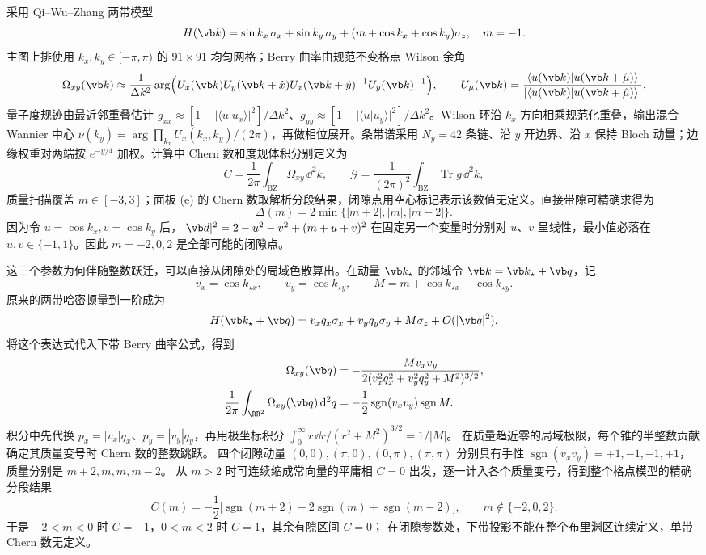 采用 Qi--Wu--Zhang 两带模型
\[H(\vb k)=\sin k_x\,\sigma_x+\sin k_y\,\sigma_y+(m+\cos k_x+\cos k_y)\sigma_z,\quad m=-1.\]
主图上排使用 $k_x,k_y\in[-\pi,\pi)$ 的 $91\times91$ 均匀网格；Berry 曲率由规范不变格点 Wilson 余角
\[\Omega_{xy}(\vb k)\approx \frac{1}{\Delta k^2}\arg\Bigl(U_x(\vb k)U_y(\vb k+\hat x)U_x(\vb k+\hat y)^{-1}U_y(\vb k)^{-1}\Bigr),\qquad U_\mu(\vb k)=\frac{\langle u(\vb k)|u(\vb k+\hat\mu)\rangle}{|\langle u(\vb k)|u(\vb k+\hat\mu)\rangle|},\]
量子度规迹由最近邻重叠估计 $g_{xx}\approx[1-|\langle u|u_{x}\rangle|^2]/\Delta k^2$、$g_{yy}\approx[1-|\langle u|u_{y}\rangle|^2]/\Delta k^2$。Wilson 环沿 $k_x$ 方向相乘规范化重叠，输出混合 Wannier 中心 $\nu(k_y)=\arg\prod_{k_x}U_x(k_x,k_y)/(2\pi)$，再做相位展开。条带谱采用 $N_y=42$ 条链、沿 $y$ 开边界、沿 $x$ 保持 Bloch 动量；边缘权重对两端按 $e^{-y/4}$ 加权。计算中 Chern 数和度规体积分别定义为
\[C=\frac{1}{2\pi}\int_{\mathrm{BZ}}\Omega_{xy}\,\dd^2 k,\qquad \mathcal G=\frac{1}{(2\pi)^2}\int_{\mathrm{BZ}}\operatorname{Tr}g\,\dd^2 k,\]
质量扫描覆盖 $m\in[-3,3]$；面板 (e) 的 Chern 数取解析分段结果，闭隙点用空心标记表示该数值无定义。直接带隙可精确求得为
\begin{equation*}
 \Delta(m)=2\min\{|m+2|,|m|,|m-2|\}.
\end{equation*}
因为令 $u=\cos k_x,v=\cos k_y$ 后，$|\vb d|^2=2-u^2-v^2+(m+u+v)^2$ 在固定另一个变量时分别对 $u$、$v$ 呈线性，最小值必落在 $u,v\in\{-1,1\}$。因此 $m=-2,0,2$ 是全部可能的闭隙点。

这三个参数为何伴随整数跃迁，可以直接从闭隙处的局域色散算出。在动量 $\vb k_\star$ 的邻域令 $\vb k=\vb k_\star+\vb q$，记
\[
 v_x=\cos k_{\star x},\qquad v_y=\cos k_{\star y},\qquad
 M=m+\cos k_{\star x}+\cos k_{\star y}.
\]
原来的两带哈密顿量到一阶成为
\[
 H(\vb k_\star+\vb q)=v_xq_x\sigma_x+v_yq_y\sigma_y+M\sigma_z+O(|\vb q|^2).
\]
将这个表达式代入下带 Berry 曲率公式，得到
\begin{align*}
 \Omega_{xy}(\vb q)
 &=-\frac{Mv_xv_y}{2(v_x^2q_x^2+v_y^2q_y^2+M^2)^{3/2}},\\
 \frac1{2\pi}\int_{\RR^2}\Omega_{xy}(\vb q)\,\dd^2q
 &=-\frac12\operatorname{sgn}(v_xv_y)\operatorname{sgn}M.
\end{align*}
积分中先代换 $p_x=|v_x|q_x$、$p_y=|v_y|q_y$，再用极坐标积分
$\int_0^\infty r\,\dd r/(r^2+M^2)^{3/2}=1/|M|$。
在质量趋近零的局域极限，每个锥的半整数贡献确定其质量变号时 Chern 数的整数跳跃。
四个闭隙动量 $(0,0),(\pi,0),(0,\pi),(\pi,\pi)$
分别具有手性 $\operatorname{sgn}(v_xv_y)=+1,-1,-1,+1$，
质量分别是 $m+2,m,m,m-2$。
从 $m>2$ 时可连续缩成常向量的平庸相 $C=0$ 出发，逐一计入各个质量变号，得到整个格点模型的精确分段结果
\begin{equation}
 C(m)=-\frac12\bigl[\operatorname{sgn}(m+2)-2\operatorname{sgn}(m)+\operatorname{sgn}(m-2)\bigr],\qquad m\notin\{-2,0,2\}.
 \label{eq:qwz-chern-phase}
\end{equation}
于是 $-2<m<0$ 时 $C=-1$，$0<m<2$ 时 $C=1$，其余有隙区间 $C=0$；
在闭隙参数处，下带投影不能在整个布里渊区连续定义，单带 Chern 数无定义。


